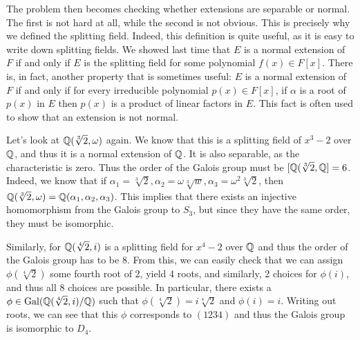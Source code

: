 \documentclass{../mathnotes}
\begin{document}
The problem then becomes checking whether extensions are separable or normal. The first is not hard at all, while the second is
not obvious. This is precisely why we defined the splitting field. Indeed, this definition is quite useful, as it is easy to write
down splitting fields. We showed last time that $E$ is a normal extension of $F$ if and only if $E$ is the splitting field for
some polynomial $f(x)\in F[x]$. There is, in fact, another property that is sometimes useful: $E$ is a normal extension of $F$ if and
only if for every irreducible polynomial $p(x)\in F[x]$, if $\alpha$ is a root of $p(x)$ in $E$ then $p(x)$ is a product of linear factors
in $E$. This fact is often used to show that an extension is not normal.

\begin{exmp}
    Let's look at $\mathbb{Q}(\sqrt[3]{2},\omega)$ again. We know that this is a splitting field of $x^3-2$ over $\mathbb{Q}$, and thus
    it is a normal extension of $\mathbb{Q}$. It is also separable, as the characteristic is zero. Thus the order of the Galois
    group must be $[\mathbb{Q}(\sqrt[3]{2},\mathbb{Q}]=6$.
    Indeed, we know that if $\alpha_1=\sqrt[3]{2},\alpha_2=\omega\sqrt[3]{w},\alpha_3=\omega^2\sqrt[3]{2}$, then
    $\mathbb{Q}(\sqrt[3]{2},\omega)=\mathbb{Q}(\alpha_1,\alpha_2,\alpha_3)$. This implies that there exists an injective
    homomorphism from the Galois group to $S_3$, but since they have the same order, they must be isomorphic.

    Similarly, for $\mathbb{Q}(\sqrt[4]{2},i)$ is a splitting field for $x^4-2$ over $\mathbb{Q}$ and thus the order of the Galois group has to be 8.
    From this, we can easily check that we can assign $\phi(\sqrt[4]{2})$ some fourth root of 2, yield 4 roots, and similarly, 2 choices
    for $\phi(i)$, and thus all 8 choices are possible. In particular, there exists a $\phi\in\operatorname{Gal}(\mathbb{Q}(\sqrt[4]{2},i)/\mathbb{Q})$ such that
    $\phi(\sqrt[4]{2})=i\sqrt[4]{2}$ and $\phi(i)=i$. Writing out roots, we can see that this $\phi$ corresponds to $(1234)$ and thus
    the Galois group is isomorphic to $D_4$.
\end{exmp}
\end{document}
